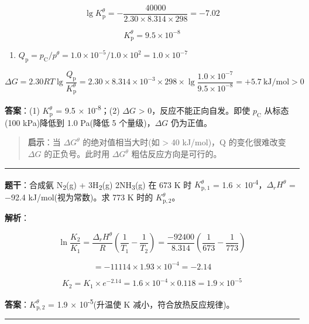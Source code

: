 \[\lg K_{\mathrm p}^\theta = -\frac{40000}{2.30 \times 8.314 \times 298} = -7.02\]

\[K_{\mathrm p}^\theta = 9.5 \times 10^{-8}\]

\begin{enumerate}
\def\labelenumi{(\arabic{enumi})}
\setcounter{enumi}{1}
\tightlist
\item
  \(Q_{\mathrm p} = p_{\mathrm C}/p^\theta = 1.0 \times 10^{-5} / 1.0 \times 10^2 = 1.0 \times 10^{-7}\)
\end{enumerate}

\[\Delta G = 2.30RT\lg\frac{Q_{\mathrm p}}{K_{\mathrm p}^\theta} = 2.30 \times 8.314 \times 10^{-3} \times 298 \times \lg\frac{1.0 \times 10^{-7}}{9.5 \times 10^{-8}} = +5.7\ \mathrm{kJ/mol} > 0\]

\textbf{答案}：(1) \(K_{\mathrm p}^\theta\) = 9.5 × 10\textsuperscript{-8}；(2) \(\Delta G\) \textgreater{} 0，反应不能正向自发。即使 \(p_{\mathrm C}\) 从标态(100 kPa)降低到 1.0 Pa(降低 5 个量级)，\(\Delta G\) 仍为正值。

\begin{quote}
\textbf{启示}：当 \(\Delta G^\theta\) 的绝对值相当大时(如 \textgreater{} 40 kJ/mol)，Q 的变化很难改变 \(\Delta G\) 的正负号。此时用 \(\Delta G^\theta\) 粗估反应方向是可行的。
\end{quote}

\begin{center}\rule{0.5\linewidth}{0.5pt}\end{center}

\textbf{题干}：合成氨 N\textsubscript{2}(g) + 3H\textsubscript{2}(g) \衡 2NH\textsubscript{3}(g) 在 673 K 时 \(K_{\mathrm p,1}^\theta\) = 1.6 × 10\textsuperscript{-4}，\(\Delta_r H^\theta\) = −92.4 kJ/mol(视为常数)。求 773 K 时的 \(K_{\mathrm p,2}^\theta\)。

\textbf{解析}：

\[\ln\frac{K_2}{K_1} = \frac{\Delta_r H^\theta}{R}\left(\frac{1}{T_1} - \frac{1}{T_2}\right) = \frac{-92400}{8.314}\left(\frac{1}{673} - \frac{1}{773}\right)\]

\[= -11114 \times 1.93 \times 10^{-4} = -2.14\]

\[K_2 = K_1 \times e^{-2.14} = 1.6 \times 10^{-4} \times 0.118 = 1.9 \times 10^{-5}\]

\textbf{答案}：\(K_{\mathrm p,2}^\theta\) = 1.9 × 10\textsuperscript{-5}(升温使 K 减小，符合放热反应规律)。

\begin{center}\rule{0.5\linewidth}{0.5pt}\end{center}

